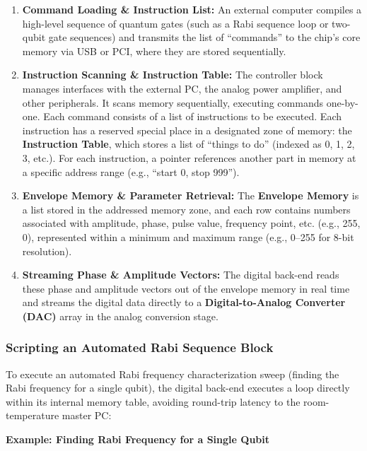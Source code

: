 \documentclass[
]{article}
\providecommand{\tightlist}{%
  \setlength{\itemsep}{0pt}\setlength{\parskip}{0pt}}
\begin{document}
\begin{enumerate}
\def\labelenumi{\arabic{enumi}.}
\tightlist
\item
  \textbf{Command Loading \& Instruction List:} An external computer
  compiles a high-level sequence of quantum gates (such as a Rabi
  sequence loop or two-qubit gate sequences) and transmits the list of
  ``commands'' to the chip's core memory via USB or PCI, where they are
  stored sequentially.
\item
  \textbf{Instruction Scanning \& Instruction Table:} The controller
  block manages interfaces with the external PC, the analog power
  amplifier, and other peripherals. It scans memory sequentially,
  executing commands one-by-one. Each command consists of a list of
  instructions to be executed. Each instruction has a reserved special
  place in a designated zone of memory: the \textbf{Instruction Table},
  which stores a list of ``things to do'' (indexed as 0, 1, 2, 3, etc.).
  For each instruction, a pointer references another part in memory at a
  specific address range (e.g., ``start 0, stop 999'').
\item
  \textbf{Envelope Memory \& Parameter Retrieval:} The \textbf{Envelope
  Memory} is a list stored in the addressed memory zone, and each row
  contains numbers associated with amplitude, phase, pulse value,
  frequency point, etc. (e.g., 255, 0), represented within a minimum and
  maximum range (e.g., 0--255 for 8-bit resolution).
\item
  \textbf{Streaming Phase \& Amplitude Vectors:} The digital back-end
  reads these phase and amplitude vectors out of the envelope memory in
  real time and streams the digital data directly to a
  \textbf{Digital-to-Analog Converter (DAC)} array in the analog
  conversion stage.
\end{enumerate}

\subsubsection{Scripting an Automated Rabi Sequence
Block}\label{scripting-an-automated-rabi-sequence-block}

To execute an automated Rabi frequency characterization sweep (finding
the Rabi frequency for a single qubit), the digital back-end executes a
loop directly within its internal memory table, avoiding round-trip
latency to the room-temperature master PC:

\textbf{Example: Finding Rabi Frequency for a Single Qubit}
\end{document}

